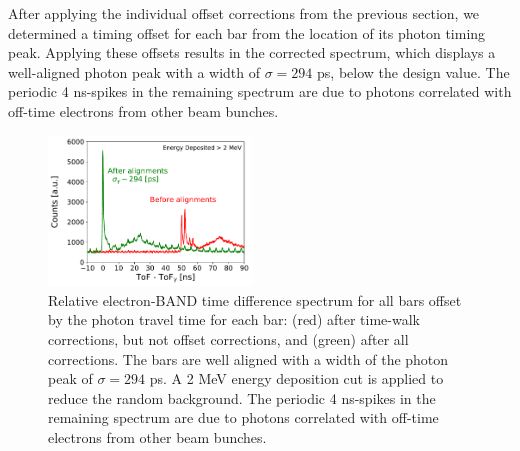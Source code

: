 \documentclass[3p,final,twocolumn]{elsarticle}
\begin{document}
After applying the individual offset corrections from the previous
section, we determined a timing offset for each bar from the location
of its photon timing peak.  Applying these offsets results in the
corrected spectrum, which displays a well-aligned photon peak with a
width of $\sigma=294$ \si{\pico\s}, below the design value.
The periodic 4 \si{\nano\s}-spikes in the remaining spectrum are due to photons
correlated with off-time electrons from other beam bunches.
 
\begin{figure}[tb]
	\centering
		\includegraphics[width=0.48\textwidth]{time-alignment.pdf}
                \caption{Relative electron-BAND time difference
                  spectrum for all bars offset by the photon travel
                  time for each bar: (red) after time-walk
                  corrections, but not offset corrections, and (green)
                  after all corrections. The bars are well
                  aligned with a width of the photon peak of
                  $\sigma=294$ \si{\pico\s}. A 2
                  \si{\mega\electronvolt} energy deposition cut is
                  applied to reduce the random background.  The
                  periodic 4 \si{\nano\s}-spikes in the remaining
                  spectrum are due to photons correlated with off-time
                  electrons from other beam bunches.}
	\label{fig:final_offset}
\end{figure}
\end{document}
